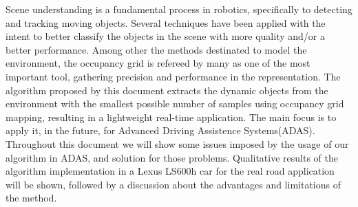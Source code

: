 Scene understanding is a fundamental process in robotics, specifically to detecting and tracking moving objects. Several techniques have been applied with the intent to better classify the objects in the scene with more quality and/or a better performance. Among other the methods destinated to model the environment, the occupancy grid is refereed by many as one of the most important tool, gathering precision and performance in the representation. The algorithm proposed by this document extracts the dynamic objects from the environment with the smallest possible number of samples using occupancy grid mapping, resulting in a lightweight real-time application. The main focus is to apply it, in the future, for  Advanced Driving Assistence Systems(ADAS). Throughout this document we will show some issues imposed by the usage of our algorithm in ADAS, and solution for those problems. Qualitative results of the algorithm implementation in a Lexus LS600h car for the real road application will be shown, followed by a discussion about the advantages and limitations of the method.


